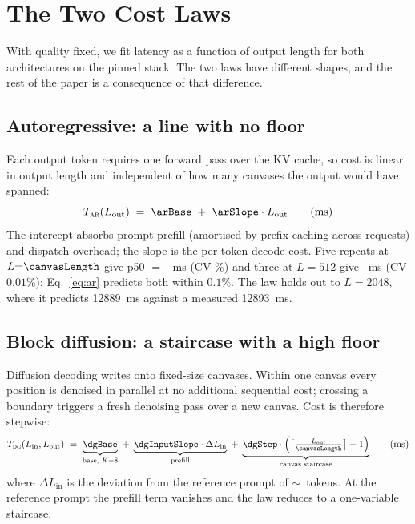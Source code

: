 \section{The Two Cost Laws}
\label{sec:laws}

With quality fixed, we fit latency as a function of output length for both
architectures on the pinned stack. The two laws have different shapes, and the
rest of the paper is a consequence of that difference.

\subsection{Autoregressive: a line with no floor}

Each output token requires one forward pass over the KV cache, so cost is
linear in output length and independent of how many canvases the output would
have spanned:
\begin{equation}
\label{eq:ar}
T_{\textsc{ar}}(L_{\mathrm{out}}) \;=\; \arBase \;+\; \arSlope \cdot L_{\mathrm{out}}
\qquad\text{(ms)}
\end{equation}
The intercept absorbs prompt prefill (amortised by prefix caching across
requests) and dispatch overhead; the slope is the per-token decode cost. Five
repeats at $L{=}\canvasLength$ give p50 $=$ \arAnchorTwoFive~ms
(CV \arCV\%) and three at $L{=}512$ give \arAnchorFiveOne~ms (CV $0.01\%$);
Eq.~\ref{eq:ar} predicts both within $0.1\%$. The law holds out to $L{=}2048$,
where it predicts \num{12889}~ms against a measured \num{12893}~ms.

\subsection{Block diffusion: a staircase with a high floor}

Diffusion decoding writes onto fixed-size canvases. Within one canvas every
position is denoised in parallel at no additional sequential cost; crossing a
boundary triggers a fresh denoising pass over a new canvas. Cost is therefore
stepwise:
\begin{equation}
\label{eq:dg}
T_{\textsc{dg}}(L_{\mathrm{in}}, L_{\mathrm{out}}) \;=\;
\underbrace{\dgBase}_{\text{base, } K=8} \;+\;
\underbrace{\dgInputSlope \cdot \Delta L_{\mathrm{in}}}_{\text{prefill}} \;+\;
\underbrace{\dgStep \cdot \Bigl(\bigl\lceil \tfrac{L_{\mathrm{out}}}{\canvasLength}\bigr\rceil - 1\Bigr)}_{\text{canvas staircase}}
\qquad\text{(ms)}
\end{equation}
where $\Delta L_{\mathrm{in}}$ is the deviation from the reference prompt of
$\sim$\ tokens. At the reference prompt the prefill term vanishes
and the law reduces to a one-variable staircase.

